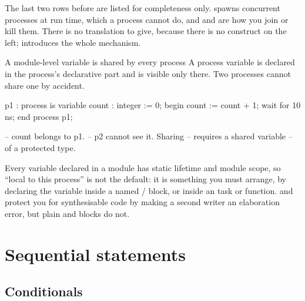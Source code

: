 The last two rows before  are listed for completeness only.
 spawns concurrent processes at run time, which a \VHDL{} process
cannot do, and  and  are how you join or
kill them. There is no translation to give, because there is no \VHDL{}
construct on the left;  introduces the whole mechanism.

\begin{gotcha}{A module-level variable is shared by every process}
A \VHDL{} process variable is declared in the process's declarative part and is
visible only there. Two processes cannot share one by accident.
\begin{rosetta}
\begin{rleft}
p1 : process is
  variable count : integer := 0;
begin
  count := count + 1;
  wait for 10 ns;
end process p1;

-- count belongs to p1.
-- p2 cannot see it. Sharing
-- requires a shared variable
-- of a protected type.
\end{rleft}
\end{rosetta}
Every variable declared in a module has static lifetime and module scope, so
``local to this process'' is not the default: it is something you must arrange, by
declaring the variable inside a named / block, or inside
an  task or function.  and 
protect you for synthesisable code by making a second writer an elaboration
error, but plain  and  blocks do not.
\end{gotcha}

\section{Sequential statements}
\label{sec:rosetta:sequential}

\subsection{Conditionals}

